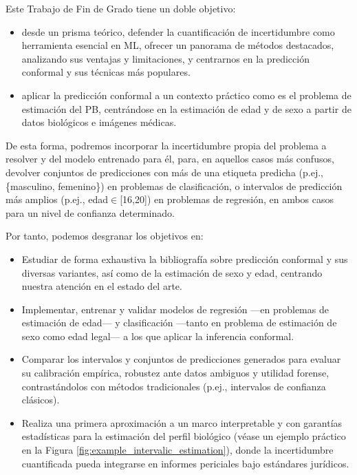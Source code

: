 Este Trabajo de Fin de Grado tiene un doble objetivo: 

\begin{itemize}

    \item desde un prisma teórico, defender la cuantificación de incertidumbre como herramienta esencial en \acrshort{ML}, ofrecer un panorama de métodos destacados, analizando sus ventajas y limitaciones, y centrarnos en la predicción conformal y sus técnicas más populares.

    \item aplicar la predicción conformal a un contexto práctico como es el problema de estimación del \acrshort{PB}, centrándose en la estimación de edad y de sexo a partir de datos biológicos e imágenes médicas.

\end{itemize}

De esta forma, podremos incorporar la incertidumbre propia del problema a resolver y del modelo entrenado para él, para, en aquellos casos más confusos, devolver conjuntos de predicciones con más de una etiqueta predicha (p.ej., \{masculino, femenino\}) en problemas de clasificación, o intervalos de predicción más amplios (p.ej., edad$\in$[16,20]) en problemas de regresión, en ambos casos para un nivel de confianza determinado.

Por tanto, podemos desgranar los objetivos en:

\begin{itemize}

    \item Estudiar de forma exhaustiva la bibliografía sobre predicción conformal y sus diversas variantes, así como de la estimación de sexo y edad, centrando nuestra atención en el estado del arte.

    \item Implementar, entrenar y validar modelos de regresión ---en problemas de estimación de edad--- y clasificación ---tanto en problema de estimación de sexo como edad legal--- a los que aplicar la inferencia conformal.

    \item Comparar los intervalos y conjuntos de predicciones generados para evaluar su calibración empírica, robustez ante datos ambiguos y utilidad forense, contrastándolos con métodos tradicionales (p.ej., intervalos de confianza clásicos).  

    \item Realiza una primera aproximación a un marco interpretable y con garantías estadísticas para la estimación del perfil biológico (véase un ejemplo práctico en la Figura \ref{fig:example_intervalic_estimation}), donde la incertidumbre cuantificada pueda integrarse en informes periciales bajo estándares jurídicos.

\end{itemize}


